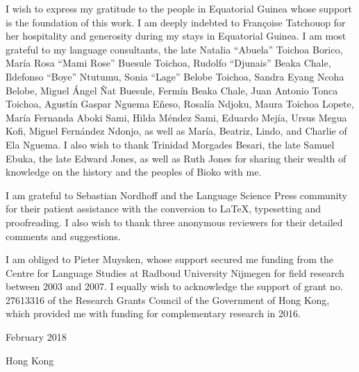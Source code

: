 
I wish to express my gratitude to the people in Equatorial Guinea whose support is the foundation of this work. I am deeply indebted to Françoise Tatchouop for her hospitality and generosity during my stays in Equatorial Guinea. I am most grateful to my language consultants, the late Natalia “Abuela” Toichoa Borico, María Rosa “Mami Rose” Buesule Toichoa, Rudolfo “Djunais” Beaka Chale, Ildefonso “Boye” Ntutumu, Sonia “Lage” Belobe Toichoa, Sandra Eyang Ncoha Belobe, Miguel Ángel Ñat Buesule, Fermín Beaka Chale, Juan Antonio Tonca Toichoa, Agustín Gaspar Nguema Eñeso, Rosalía Ndjoku, Maura Toichoa Lopete, María Fernanda Aboki Sami, Hilda Méndez Sami, Eduardo Mejía, Ursus Megua Kofi, Miguel Fernández Ndonjo, as well as María, Beatriz, Lindo, and Charlie of Ela Nguema. I also wish to thank Trinidad Morgades Besari, the late Samuel Ebuka, the late Edward Jones, as well as Ruth Jones for sharing their wealth of knowledge on the history and the peoples of Bioko with me.


I am grateful to Sebastian Nordhoff and the Language Science Press community for their patient assistance with the conversion to LaTeX, typesetting and proofreading. I also wish to thank three anonymous reviewers for their detailed comments and suggestions. 



I am obliged to Pieter Muysken, whose support secured me funding from the Centre for Language Studies at Radboud University Nijmegen for field research between 2003 and 2007. I equally wish to acknowledge the support of grant no. 27613316 of the Research Grants Council of the Government of Hong Kong, which provided me with funding for complementary research in 2016.


{February 2018}

Hong Kong
